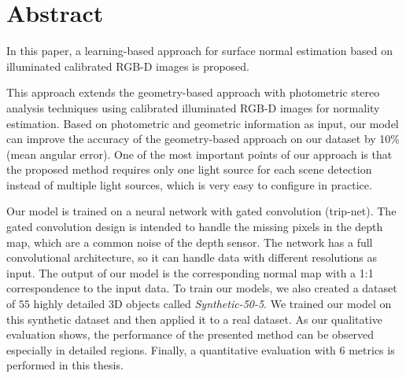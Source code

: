 \documentclass[
11pt, %
english, %
singlespacing, %
headsepline, %
]{MastersDoctoralThesis} %
\begin{document}

%


\chapter*{Abstract}
In this paper, a learning-based approach for surface normal estimation based on illuminated calibrated RGB-D images is proposed.

This approach extends the geometry-based approach with photometric stereo analysis techniques using calibrated illuminated RGB-D images for normality estimation. 
Based on photometric and geometric information as input, our model can improve the accuracy of the geometry-based approach on our dataset by 10\% (mean angular error). One of the most important points of our approach is that the proposed method requires only one light source for each scene detection instead of multiple light sources, which is very easy to configure in practice. 

Our model is trained on a neural network with gated convolution (trip-net). The gated convolution design is intended to handle the missing pixels in the depth map, which are a common noise of the depth sensor. The network has a full convolutional architecture, so it can handle data with different resolutions as input. The output of our model is the corresponding normal map with a 1:1 correspondence to the input data.  To train our models, we also created a dataset of $ 55 $ highly detailed 3D objects called \textit{Synthetic-50-5}. We trained our model on this synthetic dataset and then applied it to a real dataset. As our qualitative evaluation shows, the performance of the presented method can be observed especially in detailed regions. Finally, a quantitative evaluation with 6 metrics is performed in this thesis. 




\end{document}
